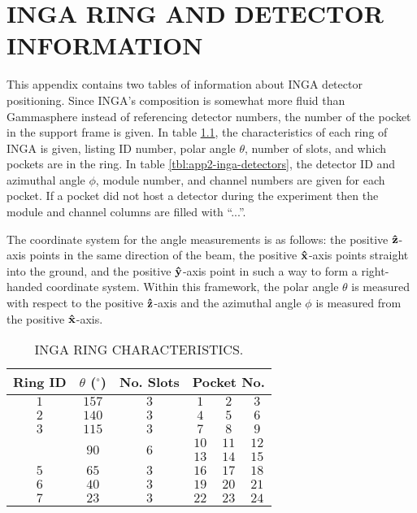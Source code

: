 %
%

\chapter{INGA RING AND DETECTOR INFORMATION}
\label{app:inga-rings-and-detectors}
This appendix contains two tables of information about INGA detector positioning. Since INGA's composition is somewhat more fluid than Gammasphere instead of referencing detector numbers, the number of the pocket in the support frame is given. In table \ref{tbl:app2-inga-rings}, the characteristics of each ring of INGA is given, listing ID number, polar angle $\theta$, number of slots, and which pockets are in the ring.  In table \ref{tbl:app2-inga-detectors}, the detector ID and azimuthal angle $\phi$, module number, and channel numbers are given for each pocket. If a pocket did not host a detector during the experiment then the module and channel columns are filled with ``...''.

The coordinate system for the angle measurements is as follows: the positive $\boldsymbol{\hat{\textbf{z}}}$-axis points in the same direction of the beam, the positive $\boldsymbol{\hat{\textbf{x}}}$-axis points straight into the ground, and the positive $\boldsymbol{\hat{\textbf{y}}}$-axis point in such a way to form a right-handed coordinate system. Within this framework, the polar angle $\theta$ is measured with respect to the positive $\boldsymbol{\hat{\textbf{z}}}$-axis and the azimuthal angle $\phi$ is measured from the positive $\boldsymbol{\hat{\textbf{x}}}$-axis.

\begin{table}
\caption{INGA RING CHARACTERISTICS.\label{tbl:app2-inga-rings}}
\begin{center}
\begin{tabular}{|c|c|c|c|c|c|}
\hline
\hline
Ring ID & $\theta$ ($^{\circ}$) & No. Slots&\multicolumn{3}{|c|}{Pocket No.}\\ 
\hline{}$1$&$157$&$3$&$1$&$2$&$3$\\
\hline{}$2$&$140$&$3$&$4$&$5$&$6$\\
\hline{}$3$&$115$&$3$&$7$&$8$&$9$\\
\hline{}\multirow{2}{*}{$4$}&\multirow{2}{*}{$90$}&\multirow{2}{*}{$6$}&$10$&$11$&$12$\\
&&&$13$&$14$&$15$\\
\hline{}$5$&$65$&$3$&$16$&$17$&$18$\\
\hline{}$6$&$40$&$3$&$19$&$20$&$21$\\
\hline{}$7$&$23$&$3$&$22$&$23$&$24$\\
\hline
\hline
\end{tabular}
\end{center}
\end{table}

